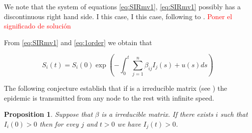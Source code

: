 \documentclass[a4paper,10pt]{article}
\newtheorem{prop}[thm]{Proposition}
\theoremstyle{remark}
\begin{document}
  
We  note that the system of equations \eqref{eq:SIRmv1}, \eqref{eq:SIRmv1} possibly has a discontinuous right hand side. I this case,  I this case, following to \cite{A.F.Filippov512}. \textcolor{red}{Poner el significado de solución}
  




From  \eqref{eq:SIRmv1} and \eqref{eq:1order} we obtain that

\[
 S_i(t)=S_i(0)
 \exp\left(
    -\int_0^t\sum\limits_{j=1}^{n} \beta_{i j} I_{j}(s)+ u(s)ds
    \right)
\]




The following conjecture establish that if is a irreducible matrix (see \cite{CarlD.Meyer538}) the epidemic is transmitted from any node to the rest with infinite speed.


\begin{prop} Suppose that $\beta$ is a irreducible matrix. If there exists $i$ such that $I_i(0)>0$ then for evey $j$ and $t>0$ we have $I_j(t)>0$.
\end{prop}
 
\end{document}
